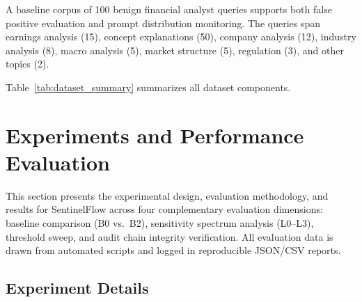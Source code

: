\documentclass[journal,12pt,onecolumn,draftclsnofoot]{IEEEtran}
\begin{document}
A baseline corpus of 100 benign financial analyst queries supports both false positive evaluation and prompt distribution monitoring. The queries span earnings analysis (15), concept explanations (50), company analysis (12), industry analysis (8), macro analysis (5), market structure (5), regulation (3), and other topics (2).

Table~\ref{tab:dataset_summary} summarizes all dataset components.

\begin{table}[!ht]
    \centering
    \caption{Dataset Summary}
    \label{tab:dataset_summary}
\end{table}




\section{Experiments and Performance Evaluation}
\label{Sect:Experimental_Procedure_Performance_Evaluation}
%
This section presents the experimental design, evaluation methodology, and results for SentinelFlow across four complementary evaluation dimensions: baseline comparison (B0 vs.\ B2), sensitivity spectrum analysis (L0--L3), threshold sweep, and audit chain integrity verification. All evaluation data is drawn from automated scripts and logged in reproducible JSON/CSV reports.

\subsection{Experiment Details}
\label{Sect:Experiment_Details}
\end{document}
